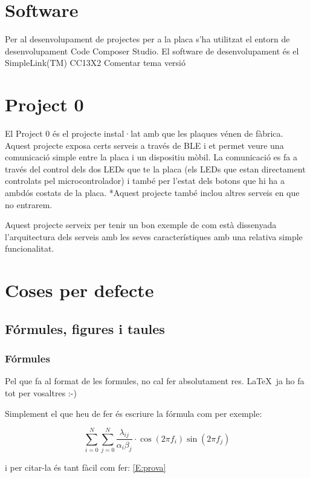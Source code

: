 \section{Software}
Per al desenvolupament de projectes per a la placa s'ha utilitzat el entorn de desenvolupament Code Composer Studio. El software de desenvolupament és el SimpleLink(TM) CC13X2
Comentar tema versió

\section{Project 0}
El Project 0 és el projecte instal·lat amb que les plaques vénen de fàbrica. Aquest projecte exposa certs serveis a través de BLE i et permet veure una comunicació simple entre la placa i un dispositiu mòbil. La comunicació es fa a través del control dels dos LEDs que te la placa (els LEDs que estan directament controlats pel microcontrolador) i també per l'estat dels botons que hi ha a ambdós costats de la placa.
*Aquest projecte també inclou altres serveis en que no entrarem.

Aquest projecte serveix per tenir un bon exemple de com està dissenyada l'arquitectura dels serveis amb les seves característiques amb una relativa simple funcionalitat.



\section{Coses per defecte}
\subsection{Fórmules, figures i taules}

\subsubsection{Fórmules}

Pel que fa al format de les formules, no cal fer absolutament res. \LaTeX \ ja ho fa tot per vosaltres :-)  

Simplement el que heu de fer és escriure la fórmula com per exemple:

\begin{equation}\label{E:prova}
\sum _{i=0}^{N} \sum _{j=0}^{N} \frac{\lambda _{ij}}{\alpha _i \beta_ j} \cdot \cos (2\pi f_i) \sin(2 \pi f_j)
\end{equation}

i per citar-la és tant fàcil com fer: \ref{E:prova}

